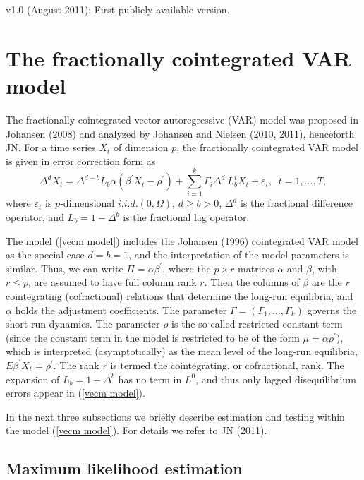 \documentclass[12pt]{article}
\begin{document}
v1.0 (August 2011): First publicly available version.


\newpage

\section{The fractionally cointegrated VAR model}

The fractionally cointegrated vector autoregressive (VAR)
model was proposed in Johansen (2008) and analyzed by Johansen and Nielsen
(2010, 2011), henceforth JN. For a time series $X_{t}$ of dimension
$p$, the fractionally cointegrated VAR model is given in error correction form as%
\begin{equation}
\Delta^{d}X_{t}=\Delta^{d-b} L_{b} \alpha (\beta^{\prime} X_{t} -\rho^{\prime}) + 
\sum_{i=1}^{k}\Gamma_{i}\Delta^{d}\ L_{b}^{i}X_{t}
+ \varepsilon_{t}, \;\; t=1,\ldots,T,
\label{vecm model}%
\end{equation}
where $\varepsilon_{t}$ is $p$-dimensional $i.i.d.(0,\Omega)$, $d\geq b>0$,
$\Delta^{d}$ is the fractional difference operator, and $L_{b}=1-\Delta^{b}$
is the fractional lag operator.

The model (\ref{vecm model}) includes the Johansen (1996)
cointegrated VAR model as the special case $d=b=1$, and the interpretation
of the model parameters is similar. Thus, we can write
$\Pi=\alpha\beta^{\prime}$, where the $p\times r$ matrices $\alpha$ and
$\beta$, with $r\leq p$, are assumed to have full column rank $r$. Then the
columns of $\beta$ are the $r$ cointegrating (cofractional) relations that
determine the long-run equilibria, and $\alpha$ holds the adjustment
coefficients. The parameter $\Gamma = (\Gamma_1 , \ldots , \Gamma_k )$
governs the short-run dynamics. The parameter $\rho$ is the so-called restricted constant term (since 
the constant term in the model is restricted to be of the form 
$\mu=\alpha\rho^{\prime}$), which is interpreted (asymptotically) as the mean level of the 
long-run equilibria, $E \beta^{\prime} X_{t} = \rho^{\prime}$. 
The rank $r$ is termed the cointegrating, or cofractional,
rank. The expansion of $L_{b}=1-\Delta^{b}$ has no term in
$L^{0}$, and thus only lagged disequilibrium errors appear in (\ref{vecm
model}).

In the next three subsections we briefly describe estimation and testing within the model (\ref{vecm model}). For details we refer to JN (2011).

\subsection{Maximum likelihood estimation}
\end{document}
